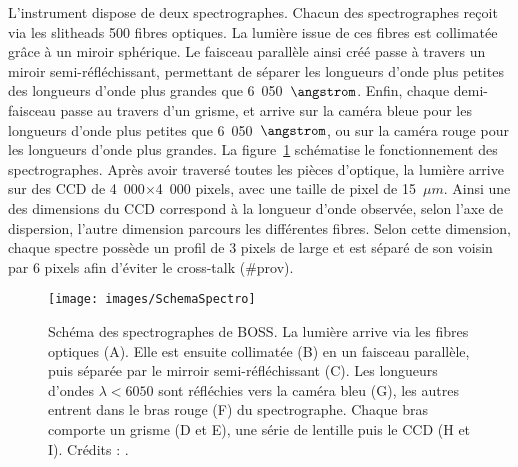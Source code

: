 \documentclass[11pt, twoside, a4paper, openright]{report}
\begin{document}
L'instrument dispose de deux spectrographes. Chacun des spectrographes reçoit via les slitheads 500 fibres optiques. La lumière issue de ces fibres est collimatée grâce à un miroir sphérique. Le faisceau parallèle ainsi créé passe à travers un miroir semi-réfléchissant, permettant de séparer les longueurs d'onde plus petites des longueurs d'onde plus grandes que 6~050~$\angstrom$. Enfin, chaque demi-faisceau passe au travers d'un grisme, et arrive sur la caméra bleue pour les longueurs d'onde plus petites que 6~050~$\angstrom$, ou sur la caméra rouge pour les longueurs d'onde plus grandes. La figure~\ref{fig:SchemaSpectro} schématise le fonctionnement des spectrographes.
Après avoir traversé toutes les pièces d'optique, la lumière arrive sur des CCD de 4~000$\times$4~000 pixels, avec une taille de pixel de 15~$\mu m$. Ainsi une des dimensions du CCD correspond à la longueur d'onde observée, selon l'axe de dispersion, l'autre dimension parcours les différentes fibres. Selon cette dimension, chaque spectre possède un profil de 3 pixels de large et  est séparé de son voisin par 6 pixels afin d'éviter le cross-talk (\#prov).
\begin{figure}
  \centering
  \texttt{[image: images/SchemaSpectro]}
  \caption{Schéma des spectrographes de BOSS. La lumière arrive via les fibres optiques (A). Elle est ensuite collimatée (B) en un faisceau parallèle, puis séparée par le mirroir semi-réfléchissant (C). Les longueurs d'ondes $\lambda < 6050$ sont réfléchies vers la caméra bleu (G), les autres entrent dans le bras rouge (F) du spectrographe. Chaque bras comporte un grisme (D et E), une série de lentille puis le CCD (H et I). Crédits : \cite{Smee2012}.}
  \label{fig:SchemaSpectro}
\end{figure}
\end{document}
